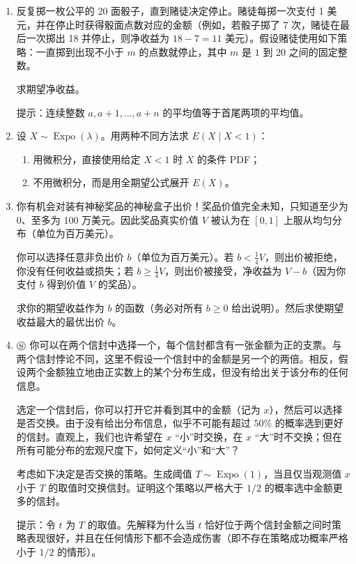 \documentclass[UTF8, 12pt, fontset=fandol, oneside]{ctexart}
\begin{document}
\begin{enumerate}
  \item 反复掷一枚公平的 20 面骰子，直到赌徒决定停止。赌徒每掷一次支付 1 美元，并在停止时获得骰面点数对应的金额（例如，若骰子掷了 7 次，赌徒在最后一次掷出 18 并停止，则净收益为 $18-7=11$ 美元）。假设赌徒使用如下策略：一直掷到出现不小于 $m$ 的点数就停止，其中 $m$ 是 $1$ 到 $20$ 之间的固定整数。

  求期望净收益。

  \noindent 提示：连续整数 $a,a+1,\ldots,a+n$ 的平均值等于首尾两项的平均值。

  \item 设 $X\sim\operatorname{Expo}(\lambda)$。用两种不同方法求 $E(X\mid X<1)$：
  \begin{enumerate}
    \item[(a)] 用微积分，直接使用给定 $X<1$ 时 $X$ 的条件 PDF；
    \item[(b)] 不用微积分，而是用全期望公式展开 $E(X)$。
  \end{enumerate}

  \item 你有机会对装有神秘奖品的神秘盒子出价！奖品价值完全未知，只知道至少为 0、至多为 100 万美元。因此奖品真实价值 $V$ 被认为在 $[0,1]$ 上服从均匀分布（单位为百万美元）。

  你可以选择任意非负出价 $b$（单位为百万美元）。若 $b<\frac14V$，则出价被拒绝，你没有任何收益或损失；若 $b\ge\frac14V$，则出价被接受，净收益为 $V-b$（因为你支付 $b$ 得到价值 $V$ 的奖品）。

  求你的期望收益作为 $b$ 的函数（务必对所有 $b\ge0$ 给出说明）。然后求使期望收益最大的最优出价 $b$。

  \item $\circledS$ 你可以在两个信封中选择一个，每个信封都含有一张金额为正的支票。与两个信封悖论不同，这里不假设一个信封中的金额是另一个的两倍。相反，假设两个金额独立地由正实数上的某个分布生成，但没有给出关于该分布的任何信息。

  选定一个信封后，你可以打开它并看到其中的金额（记为 $x$），然后可以选择是否交换。由于没有给出分布信息，似乎不可能有超过 $50\%$ 的概率选到更好的信封。直观上，我们也许希望在 $x$ “小”时交换，在 $x$ “大”时不交换；但在所有可能分布的宏观尺度下，如何定义“小”和“大”？

  考虑如下决定是否交换的策略。生成阈值 $T\sim\operatorname{Expo}(1)$，当且仅当观测值 $x$ 小于 $T$ 的取值时交换信封。证明这个策略以严格大于 $1/2$ 的概率选中金额更多的信封。

  \noindent 提示：令 $t$ 为 $T$ 的取值。先解释为什么当 $t$ 恰好位于两个信封金额之间时策略表现很好，并且在任何情形下都不会造成伤害（即不存在策略成功概率严格小于 $1/2$ 的情形）。


\end{enumerate}
\end{document}

